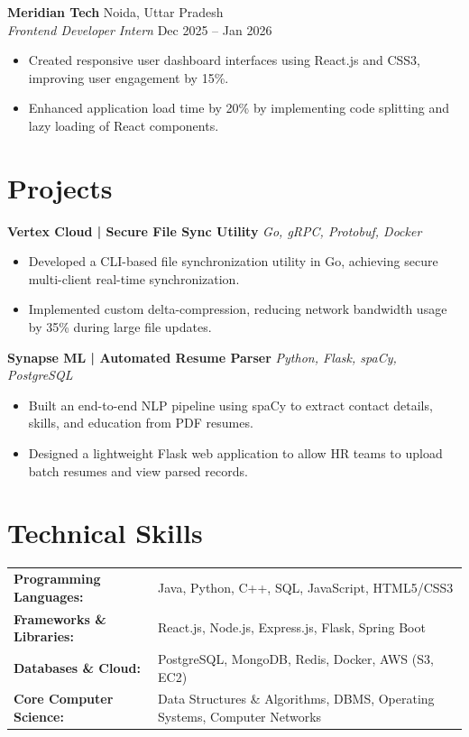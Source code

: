 \documentclass[a4paper,10pt]{article}
\begin{document}
\vspace{1.5mm}
\noindent
\textbf{Meridian Tech} \hfill Noida, Uttar Pradesh \\
\textit{Frontend Developer Intern} \hfill Dec 2025 -- Jan 2026
\begin{itemize}
    \item Created responsive user dashboard interfaces using React.js and CSS3, improving user engagement by 15\%.
    \item Enhanced application load time by 20\% by implementing code splitting and lazy loading of React components.
\end{itemize}

\section*{Projects}
\noindent
\textbf{Vertex Cloud | Secure File Sync Utility} \hfill \textit{Go, gRPC, Protobuf, Docker} \\
\begin{itemize}
    \item Developed a CLI-based file synchronization utility in Go, achieving secure multi-client real-time synchronization.
    \item Implemented custom delta-compression, reducing network bandwidth usage by 35\% during large file updates.
\end{itemize}

\vspace{1.5mm}
\noindent
\textbf{Synapse ML | Automated Resume Parser} \hfill \textit{Python, Flask, spaCy, PostgreSQL} \\
\begin{itemize}
    \item Built an end-to-end NLP pipeline using spaCy to extract contact details, skills, and education from PDF resumes.
    \item Designed a lightweight Flask web application to allow HR teams to upload batch resumes and view parsed records.
\end{itemize}

\section*{Technical Skills}
\noindent
\begin{tabularx}{\textwidth}{@{}l X@{}}
\textbf{Programming Languages:} & Java, Python, C++, SQL, JavaScript, HTML5/CSS3 \\
\textbf{Frameworks \& Libraries:} & React.js, Node.js, Express.js, Flask, Spring Boot \\
\textbf{Databases \& Cloud:} & PostgreSQL, MongoDB, Redis, Docker, AWS (S3, EC2) \\
\textbf{Core Computer Science:} & Data Structures \& Algorithms, DBMS, Operating Systems, Computer Networks \\
\end{tabularx}
\end{document}
